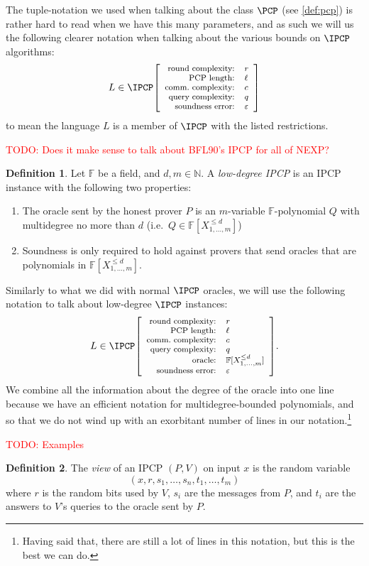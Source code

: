 \documentclass[english,12pt]{reedthesis}
\theoremstyle{plain}
\theoremstyle{definition}
\newtheorem{defn}[defn]{Definition}
\theoremstyle{remark}
\newcommand{\ipcp}[5]{%
  \ensuremath%
  \mleft[{\footnotesize\begin{array}{r l}
    \text{round complexity:} & #1 \\
    \text{PCP length:} & #2 \\
    \text{comm.\ complexity:} & #3 \\
    \text{query complexity:} & #4 \\
    \text{soundness error:} & #5
  \end{array}}\mright]%
}
\newcommand{\ldipcp}[6]{%
  \ensuremath%
  \mleft[{\footnotesize\begin{array}{r l}
    \text{round complexity:} & #1 \\
    \text{PCP length:} & #2 \\
    \text{comm.\ complexity:} & #3 \\
    \text{query complexity:} & #4 \\
    \text{oracle:} & #5 \\
    \text{soundness error:} & #6
  \end{array}}\mright]%
}
\newcommand{\TODO}[1]{\textcolor{red}{TODO: #1}}
\begin{document}
The tuple-notation we used when talking about the class $\PCP$ (see
\cref{def:pcp}) is rather hard to read when we have this many parameters, and as
such we will us the following clearer notation when talking about the various
bounds on $\IPCP$ algorithms:
\begin{equation*}
  L \in \IPCP\ipcp{r}{\ell}{c}{q}{\varepsilon}
\end{equation*}
to mean the language $L$ is a member of $\IPCP$ with the listed restrictions.

\TODO{Does it make sense to talk about BFL90's IPCP for all of NEXP?}

\begin{defn}\label{def:low-deg-ipcp}
  Let $\mathbb{F}$ be a field, and $d, m \in \mathbb{N}$. A \emph{low-degree IPCP} is an
  IPCP instance with the following two properties:
  \begin{enumerate}
    \item The oracle sent by the honest prover $P$ is an $m$-variable
          $\mathbb{F}$-polynomial $Q$ with multidegree no more than $d$ (i.e.\
          $Q \in \mathbb{F}[X_{1, \ldots, m}^{\le d}]$)
    \item Soundness is only required to hold against provers that send oracles
          that are polynomials in $\mathbb{F}[X_{1, \ldots, m}^{\le d}]$.
  \end{enumerate}
\end{defn}

Similarly to what we did with normal $\IPCP$ oracles, we will use the following
notation to talk about low-degree $\IPCP$ instances:
\begin{equation*}
  L \in \IPCP\ldipcp{r}{\ell}{c}{q}{\mathbb{F}[X_{1, \ldots, m}^{\le d}]}{\varepsilon}.
\end{equation*}
We combine all the information about the degree of the oracle into one line
because we have an efficient notation for multidegree-bounded polynomials, and
so that we do not wind up with an exorbitant number of lines in our
notation.\footnote{Having said that, there are still a lot of lines in this
  notation, but this is the best we can do.}

\TODO{Examples}

\begin{defn}\label{def:ipcp-view}
  The \emph{view} of an IPCP $(P, V)$ on input $x$ is the random variable
  \[
    (x, r, s_{1}, \ldots, s_{n}, t_{1}, \ldots, t_{m})
  \]
  where $r$ is the random bits used by $V$, $s_{i}$ are the messages from $P$,
  and $t_{i}$ are the answers to $V$'s queries to the oracle sent by $P$.
\end{defn}
\end{document}
